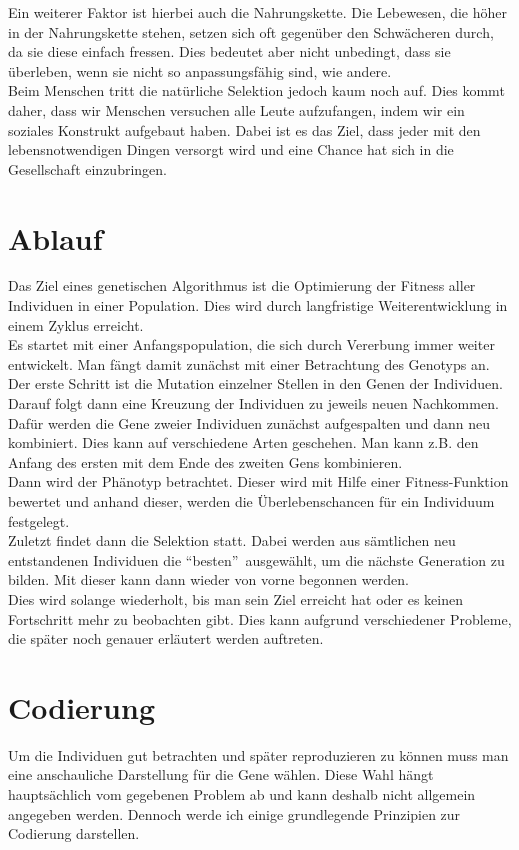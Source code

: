 Ein weiterer Faktor ist hierbei auch die Nahrungskette. Die Lebewesen, die höher in der Nahrungskette stehen, setzen sich oft gegenüber den Schwächeren durch, da sie diese einfach fressen. Dies bedeutet aber nicht unbedingt, dass sie überleben, wenn sie nicht so anpassungsfähig sind, wie andere.\\
Beim Menschen tritt die natürliche Selektion jedoch kaum noch auf. Dies kommt daher, dass wir Menschen versuchen alle Leute aufzufangen, indem wir ein soziales Konstrukt aufgebaut haben. Dabei ist es das Ziel, dass jeder mit den lebensnotwendigen Dingen versorgt wird und eine Chance hat sich in die Gesellschaft einzubringen.\\

\section{Ablauf}
Das Ziel eines genetischen Algorithmus ist die Optimierung der Fitness aller Individuen in einer Population. Dies wird durch langfristige Weiterentwicklung in einem Zyklus erreicht.\\
Es startet mit einer Anfangspopulation, die sich durch Vererbung immer weiter entwickelt. Man fängt damit zunächst mit einer Betrachtung des Genotyps an.\\
Der erste Schritt ist die Mutation einzelner Stellen in den Genen der Individuen.\\
Darauf folgt dann eine Kreuzung der Individuen zu jeweils neuen Nachkommen. Dafür werden die Gene zweier Individuen zunächst aufgespalten und dann neu kombiniert. Dies kann auf verschiedene Arten geschehen. Man kann z.B. den Anfang des ersten mit dem Ende des zweiten Gens kombinieren.\\
Dann wird der Phänotyp betrachtet. Dieser wird mit Hilfe einer Fitness-Funktion bewertet und anhand dieser, werden die Überlebenschancen für ein Individuum festgelegt.\\
Zuletzt findet dann die Selektion statt. Dabei werden aus sämtlichen neu entstandenen Individuen die \textquotedblleft besten\textquotedblright\ ausgewählt, um die nächste Generation zu bilden. Mit dieser kann dann wieder von vorne begonnen werden.\\
Dies wird solange wiederholt, bis man sein Ziel erreicht hat oder es keinen Fortschritt mehr zu beobachten gibt. Dies kann aufgrund verschiedener Probleme, die später noch genauer erläutert werden auftreten.

\section{Codierung}
Um die Individuen gut betrachten und später reproduzieren zu können muss man eine anschauliche Darstellung für die Gene wählen. Diese Wahl hängt hauptsächlich vom gegebenen Problem ab und kann deshalb nicht allgemein angegeben werden. Dennoch werde ich einige grundlegende Prinzipien zur Codierung darstellen.

